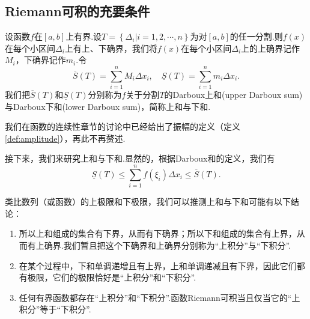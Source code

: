 \subsection{Riemann可积的充要条件}
\begin{definition}[Darboux和]
	设函数$f$在$\left[a,b\right]$上有界.设$T=\left\{\Delta_i|i=1,2,\cdots,n\right\}$为对$\left[a,b\right]$的任一分割.则$f(x)$在每个小区间$\Delta_i$上有上、下确界，我们将$f(x)$在每个小区间$\Delta_i$上的上确界记作$M_i$，下确界记作$m_i$.令
	$$\overline{S}(T)=\sum_{i=1}^{n}M_i\Delta x_i,\quad \underline{S}(T)=\sum_{i=1}^{n}m_i\Delta x_i.$$
	我们把$\overline{S}(T)$和$\underline{S}(T)$分别称为$f$关于分割$T$的{\heiti Darboux上和}(upper Darboux sum)与{\heiti Darboux下和}(lower Darboux sum)，简称{\heiti 上和}与{\heiti 下和}.
\end{definition}
我们在函数的连续性章节的讨论中已经给出了振幅的定义（定义\ref{def:amplitude}），再此不再赘述.

接下来，我们来研究上和与下和.显然的，根据Darboux和的定义，我们有
$$\underline{S}(T)\leqslant \sum_{i=1}^{n}f(\xi_i)\Delta x_i\leqslant \overline{S}(T).$$

类比数列（或函数）的上极限和下极限，我们可以推测上和与下和可能有以下结论：
\begin{enumerate}
	\item 所以上和组成的集合有下界，从而有下确界；所以下和组成的集合有上界，从而有上确界.我们暂且把这个下确界和上确界分别称为“上积分”与“下积分”.
	\item 在某个过程中，下和单调递增且有上界，上和单调递减且有下界，因此它们都有极限，它们的极限恰好是“上积分”和“下积分”.
	\item 任何有界函数都存在“上积分”和“下积分”.函数Riemann可积当且仅当它的“上积分”等于“下积分”.
\end{enumerate}

